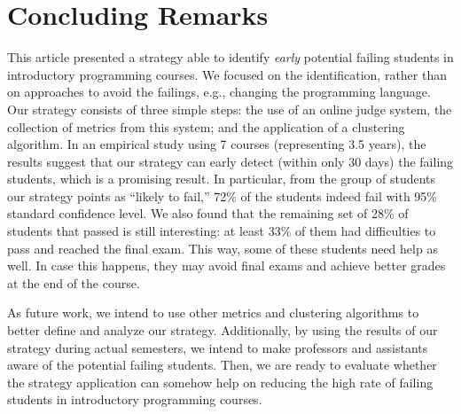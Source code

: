 \section{Concluding Remarks}

\label{sec:conclusion}

This article presented a strategy able to identify \textit{early} potential failing students in introductory programming courses. We focused on the identification, rather than on approaches to avoid the failings, e.g., changing the programming language. Our strategy consists of three simple steps: the use of an online judge system, the collection of metrics from this system; and the application of a clustering algorithm. In an empirical study using 7 courses (representing 3.5 years), the results suggest that our strategy can early detect (within only 30 days) the failing students, which is a promising result. In particular, from the group of students our strategy points as ``likely to fail,'' 72\% of the students indeed fail with 95\% standard confidence level. We also found that the remaining set of 28\% of students that passed is still interesting: at least 33\% of them had difficulties to pass and reached the final exam. This way, some of these students need help as well. In case this happens, they may avoid final exams and achieve better grades at the end of the course.

As future work, we intend to use other metrics and clustering algorithms to better define and analyze our strategy. Additionally, by using the results of our strategy during actual semesters, we intend to make professors and assistants aware of the potential failing students. Then, we are ready to evaluate whether the strategy application can somehow help on reducing the high rate of failing students in introductory programming courses.